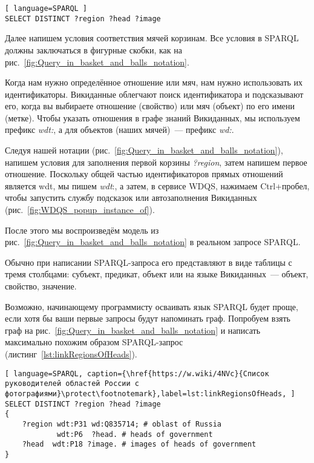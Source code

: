 \begin{lstlisting}[ language=SPARQL ]
SELECT DISTINCT ?region ?head ?image
\end{lstlisting}

Далее напишем условия соответствия мячей корзинам. Все условия в SPARQL должны заключаться в фигурные скобки, как на рис.~\ref{fig:Query_in_basket_and_balls_notation}.

Когда нам нужно определённое отношение или мяч, нам нужно использовать их идентификаторы. Викиданные облегчают поиск идентификатора и подсказывают его, когда вы выбираете отношение (свойство) или мяч (объект) по его имени (метке). Чтобы указать отношения в графе знаний Викиданных, мы используем префикс \textit{wdt:}, а для объектов (наших мячей)~--- префикс \textit{wd:}.

Следуя нашей нотации (рис.~\ref{fig:Query_in_basket_and_balls_notation}), напишем условия для заполнения первой корзины \textit{?region}, затем напишем первое отношение. Поскольку общей частью идентификаторов прямых отношений является wdt, мы пишем \textit{wdt}:, а затем, в сервисе WDQS, нажимаем Ctrl+пробел, чтобы запустить службу подсказок или  автозаполнения Викиданных (рис.~\ref{fig:WDQS_popup_instance_of}).

\begin{marginfigure}[0cm]
	{
		\setlength{\fboxsep}{0pt}%
		\setlength{\fboxrule}{1pt}%
	}
    \caption[Меню автозаполнения свойства Викиданых в сервисе WDQS.]{С помощью команды Ctrl+пробел открылось выпадающее контекстное меню автозаполнения свойства Викиданых.}
	\label{fig:WDQS_popup_instance_of}
\end{marginfigure}

После этого мы воспроизведём модель из рис.~\ref{fig:Query_in_basket_and_balls_notation} в реальном запросе SPARQL.

Обычно при написании SPARQL-запроса его представляют в виде таблицы с тремя столбцами: субъект, предикат, объект или на языке Викиданных~--- объект, свойство, значение.

Возможно, начинающему программисту осваивать язык SPARQL будет проще, если хотя бы ваши первые запросы будут напоминать граф. Попробуем взять граф на рис.~\ref{fig:Query_in_basket_and_balls_notation} и написать максимально похожим образом SPARQL-запрос (листинг~\ref{lst:linkRegionsOfHeads}).

\begin{lstlisting}[ language=SPARQL, caption={\href{https://w.wiki/4NVc}{Список руководителей областей России с фотографиями}\protect\footnotemark},label=lst:linkRegionsOfHeads, ]
SELECT DISTINCT ?region ?head ?image
{
    ?region wdt:P31 wd:Q835714; # oblast of Russia
            wdt:P6  ?head. # heads of government
    ?head  wdt:P18 ?image. # images of heads of government
}
\end{lstlisting}

